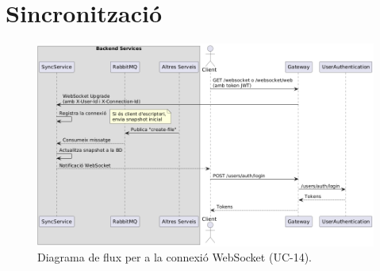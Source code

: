 \section{Sincronització}

\begin{figure}[H]
    \centering
    \includegraphics[width=1\textwidth]{Figures/flux/connect_websocket.png}
    \caption{Diagrama de flux per a la connexió WebSocket (UC-14).}
    \label{fig:flow_connect_websocket}
\end{figure} 